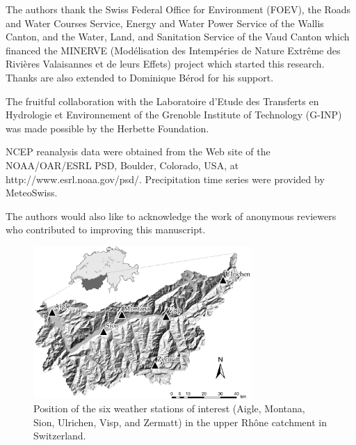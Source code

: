 \documentclass[hess, manuscript]{copernicus}
\begin{document}
	\begin{acknowledgements}
		The authors thank the Swiss Federal Office for Environment (FOEV), the Roads and Water Courses Service, Energy and Water Power Service of the Wallis Canton, and the Water, Land, and Sanitation Service of the Vaud Canton which financed the MINERVE (Mod\'{e}lisation des Intemp\'{e}ries de Nature Extr\^{e}me des Rivi\`{e}res Valaisannes et de leurs Effets) project which started this research. Thanks are also extended to Dominique B\'{e}rod for his support.
		
		The fruitful collaboration with the Laboratoire d'Etude des Transferts en Hydrologie et Environnement of the Grenoble Institute of Technology (G-INP) was made possible by the Herbette Foundation. 
		
		NCEP reanalysis data were obtained from the Web site of the NOAA/OAR/ESRL PSD, Boulder, Colorado, USA, at http://www.esrl.noaa.gov/psd/. Precipitation time series were provided by MeteoSwiss.
		
		The authors would also like to acknowledge the work of anonymous reviewers who contributed to improving this manuscript. 
	\end{acknowledgements}
	
	
	
	
	
	
	
	
	
	
	\begin{figure}[htb]
		\begin{center}
			\includegraphics[width=8.3cm]{fig01.pdf}
		\end{center}
		\caption{Position of the six weather stations of interest (Aigle, Montana, Sion, Ulrichen, Visp, and Zermatt) in the upper Rh\^{o}ne catchment in Switzerland.}
		\label{fig:map}
	\end{figure}
	
\end{document}
